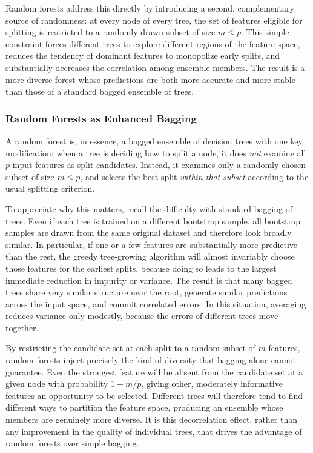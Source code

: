 Random forests address this directly by introducing a second, complementary source of randomness: at every node of every tree, the set of features eligible for splitting is restricted to a randomly drawn subset of size $m \leq p$. This simple constraint forces different trees to explore different regions of the feature space, reduces the tendency of dominant features to monopolize early splits, and substantially decreases the correlation among ensemble members. The result is a more diverse forest whose predictions are both more accurate and more stable than those of a standard bagged ensemble of trees.

\subsubsection*{Random Forests as Enhanced Bagging}

A random forest is, in essence, a bagged ensemble of decision trees with one key modification: when a tree is deciding how to split a node, it does \emph{not} examine all $p$ input features as split candidates. Instead, it examines only a randomly chosen subset of size $m \leq p$, and selects the best split \emph{within that subset} according to the usual splitting criterion.

To appreciate why this matters, recall the difficulty with standard bagging of trees. Even if each tree is trained on a different bootstrap sample, all bootstrap samples are drawn from the same original dataset and therefore look broadly similar. In particular, if one or a few features are substantially more predictive than the rest, the greedy tree-growing algorithm will almost invariably choose those features for the earliest splits, because doing so leads to the largest immediate reduction in impurity or variance. The result is that many bagged trees share very similar structure near the root, generate similar predictions across the input space, and commit correlated errors. In this situation, averaging reduces variance only modestly, because the errors of different trees move together.

By restricting the candidate set at each split to a random subset of $m$ features, random forests inject precisely the kind of diversity that bagging alone cannot guarantee. Even the strongest feature will be absent from the candidate set at a given node with probability $1 - m/p$, giving other, moderately informative features an opportunity to be selected. Different trees will therefore tend to find different ways to partition the feature space, producing an ensemble whose members are genuinely more diverse. It is this decorrelation effect, rather than any improvement in the quality of individual trees, that drives the advantage of random forests over simple bagging.

